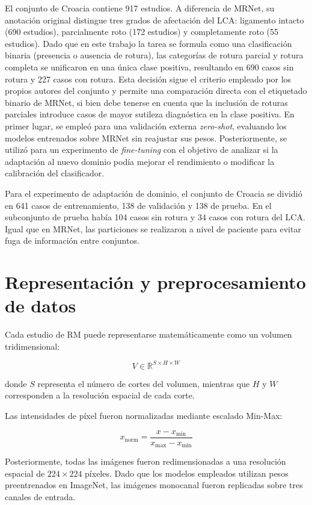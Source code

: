 El conjunto de Croacia contiene 917 estudios. A diferencia de MRNet, su anotación original distingue tres grados de afectación del LCA: ligamento intacto (690 estudios), parcialmente roto (172 estudios) y completamente roto (55 estudios). Dado que en este trabajo la tarea se formula como una clasificación binaria (presencia o ausencia de rotura), las categorías de rotura parcial y rotura completa se unificaron en una única clase positiva, resultando en 690 casos sin rotura y 227 casos con rotura. Esta decisión sigue el criterio empleado por los propios autores del conjunto \cite{stajduhar2017semi} y permite una comparación directa con el etiquetado binario de MRNet, si bien debe tenerse en cuenta que la inclusión de roturas parciales introduce casos de mayor sutileza diagnóstica en la clase positiva. En primer lugar, se empleó para una validación externa \textit{zero-shot}, evaluando los modelos entrenados sobre MRNet sin reajustar sus pesos. Posteriormente, se utilizó para un experimento de \textit{fine-tuning} con el objetivo de analizar si la adaptación al nuevo dominio podía mejorar el rendimiento o modificar la calibración del clasificador.

Para el experimento de adaptación de dominio, el conjunto de Croacia se dividió en 641 casos de entrenamiento, 138 de validación y 138 de prueba. En el subconjunto de prueba había 104 casos sin rotura y 34 casos con rotura del LCA. Igual que en MRNet, las particiones se realizaron a nivel de paciente para evitar fuga de información entre conjuntos.

\section{Representación y preprocesamiento de datos}

Cada estudio de RM puede representarse matemáticamente como un volumen tridimensional:

\begin{equation}
V \in \mathbb{R}^{S \times H \times W}
\end{equation}

\noindent donde $S$ representa el número de cortes del volumen, mientras que $H$ y $W$ corresponden a la resolución espacial de cada corte.

Las intensidades de píxel fueron normalizadas mediante escalado Min-Max:

\begin{equation}
x_{\text{norm}} =
\frac{x - x_{\text{min}}}
{x_{\text{max}} - x_{\text{min}}}
\end{equation}

Posteriormente, todas las imágenes fueron redimensionadas a una resolución espacial de $224 \times 224$ píxeles. Dado que los modelos empleados utilizan pesos preentrenados en ImageNet, las imágenes monocanal fueron replicadas sobre tres canales de entrada.